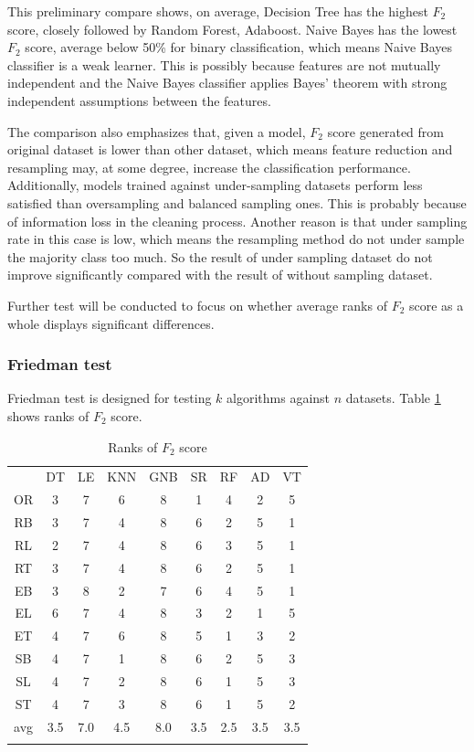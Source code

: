 This preliminary compare shows, on average, Decision Tree has the highest $F_2$ score, closely followed by Random Forest, Adaboost. Naive Bayes has the lowest $F_2$ score, average below 50\% for binary classification, which means Naive Bayes classifier is a weak learner. This is possibly because features are not mutually independent and the Naive Bayes classifier applies Bayes’ theorem with strong independent assumptions between the features. 

The comparison also emphasizes that, given a model, $F_2$ score generated from original dataset is lower than other dataset, which means feature reduction and  resampling may, at some degree, increase the classification performance. Additionally, models trained against under-sampling datasets perform less satisfied than oversampling and balanced sampling ones. This is probably because of information loss in the cleaning process. Another reason is that under sampling rate in this case is low, which means the resampling method do not under sample the majority class too much. So the result of under sampling dataset do not improve significantly compared with the result of without sampling dataset.

Further test will be conducted to focus on whether average ranks of $F_2$ score as a whole displays significant differences.

\subsubsection{Friedman test}
Friedman test\citep{Friedman} is designed for testing $k$ algorithms against $n$ datasets. Table \ref{tab: avg ranks} shows ranks of $F_2$ score.

\begin{table}[h]
\caption{Ranks of $F_2$ score}
\label{tab: avg ranks}       %
\begin{tabular}{ccccccccc}
\hline\noalign{\smallskip}
 & DT & LE & KNN &  GNB & SR & RF & AD & VT \\
\noalign{\smallskip}\hline\noalign{\smallskip}
OR & 3 & 7 & 6 & 8 & 1 & 4 & 2 & 5 \\
RB & 3 & 7 & 4 & 8 & 6 & 2 & 5 & 1\\
RL & 2 & 7 & 4 & 8 & 6 & 3 & 5 & 1\\
RT & 3 & 7 & 4 & 8 & 6 & 2 & 5 & 1\\
EB & 3 & 8 & 2 & 7 & 6 & 4 & 5 & 1\\
EL & 6 & 7 & 4 & 8 & 3 & 2 & 1 & 5\\
ET & 4 & 7 & 6 & 8 & 5 & 1 & 3 & 2\\
SB & 4 & 7 & 1 & 8 & 6 & 2 & 5 & 3\\
SL & 4 & 7 & 2 & 8 & 6 & 1 & 5 & 3\\
ST & 4 & 7 & 3 & 8 & 6 & 1 & 5 & 2\\
\noalign{\smallskip}\hline\noalign{\smallskip}
avg & 3.5 & 7.0 & 4.5& 8.0 & 3.5 & 2.5 & 3.5 & 3.5\\
\noalign{\smallskip}\hline
\end{tabular}
\end{table}

